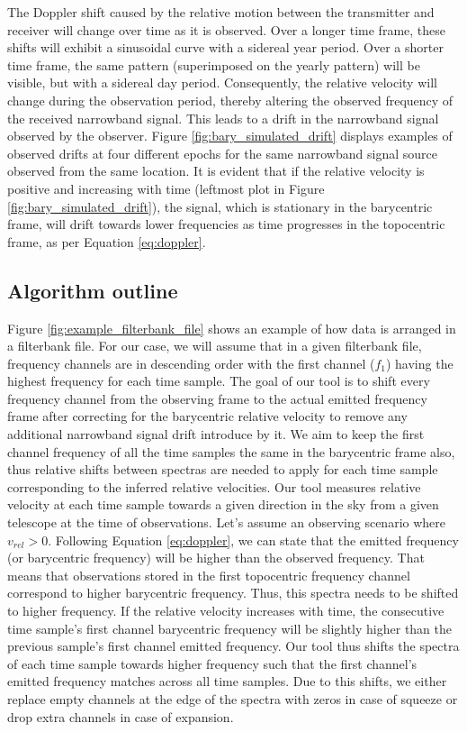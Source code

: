 The Doppler shift caused by the relative motion between the transmitter and receiver will change over time as it is observed. Over a longer time frame, these shifts will exhibit a sinusoidal curve with a sidereal year period. Over a shorter time frame, the same pattern (superimposed on the yearly pattern) will be visible, but with a sidereal day period. Consequently, the relative velocity will change during the observation period, thereby altering the observed frequency of the received narrowband signal. This leads to a drift in the narrowband signal observed by the observer. Figure \ref{fig:bary_simulated_drift} displays examples of observed drifts at four different epochs for the same narrowband signal source observed from the same location. It is evident that if the relative velocity is positive and increasing with time (leftmost plot in Figure \ref{fig:bary_simulated_drift}), the signal, which is stationary in the barycentric frame, will drift towards lower frequencies as time progresses in the topocentric frame, as per Equation \ref{eq:doppler}.

\subsection{Algorithm outline}
Figure \ref{fig:example_filterbank_file} shows an example of how data is arranged in a filterbank file. For our case, we will assume that in a given filterbank file, frequency channels are in descending order with the first channel ($f_{1}$) having the highest frequency for each time sample. 
The goal of our tool is to shift every frequency channel from the observing frame to the actual emitted frequency frame after correcting for the barycentric relative velocity to remove any additional narrowband signal drift introduce by it. We aim to keep the first channel frequency of all the time samples the same in the barycentric frame also, thus relative shifts between spectras are needed to apply for each time sample corresponding to the inferred relative velocities. Our tool measures relative velocity at each time sample towards a given direction in the sky from a given telescope at the time of observations. Let's assume an observing scenario where $v_{rel}>0$. Following Equation \ref{eq:doppler}, we can state that the emitted frequency (or barycentric frequency) will be higher than the observed frequency. That means that observations stored in the first topocentric frequency channel correspond to higher barycentric frequency. Thus, this spectra needs to be shifted to higher frequency. If the relative velocity increases with time, the consecutive time sample's first channel barycentric frequency will be slightly higher than  the previous sample's first channel emitted frequency. Our tool thus shifts the spectra of each time sample towards higher frequency such that the first channel's emitted frequency matches across all time samples. 
Due to this shifts, we either replace empty channels at the edge of the spectra with zeros in case of squeeze or drop extra channels in case of expansion. 

